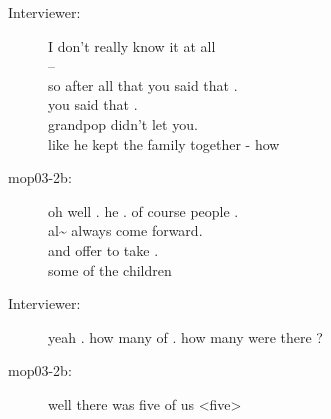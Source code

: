 \documentclass{article}
\newcommand{\turn}[2]{
\item[#1:] #2
}
\begin{document}
\begin{description}
\turn{Interviewer}{I don't really know it at all\\
 -- \\
so after all that you said that .\\
you said that .\\
grandpop didn't let you.\\
like he kept the family together - how}

\turn{mop03-2b}{oh well . he . of course people .\\
al\~{}  always come forward.\\
and offer to take .\\
some of the children}

\turn{Interviewer}{yeah . how many of . how many were there ?}

\turn{mop03-2b}{ well there was five of us \textless five\textgreater }


\end{description}
\end{document}
